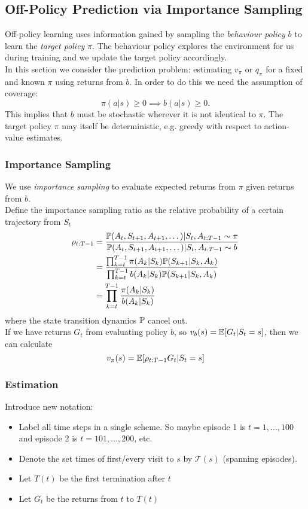 \subsection{Off-Policy Prediction via Importance Sampling}
Off-policy learning uses information gained by sampling the \emph{behaviour policy} $b$ to learn the \emph{target policy} $\pi$. The behaviour policy explores the environment for us during training and we update the target policy accordingly.\\

In this section we consider the prediction problem: estimating $v_\pi$ or $q_\pi$ for a fixed and known $\pi$ using returns from $b$. In order to do this we need the assumption of coverage:
\begin{equation}
    \pi(a|s) \geq 0 \implies b(a|s) \geq 0.
\end{equation}
This implies that $b$ must be stochastic wherever it is not identical to $\pi$. The target policy $\pi$ may itself be deterministic, e.g. greedy with respect to action-value estimates.

\subsubsection*{Importance Sampling}
We use \emph{importance sampling} to evaluate expected returns from $\pi$ given returns from $b$.\\

Define the importance sampling ratio as the relative probability of a certain trajectory from $S_t$
\begin{align}
    \rho_{t:T-1} &= \frac{\P{}(A_t, S_{t+1}, A_{t+1}, \dots)| S_t, A_{t:T-1} \sim \pi}{\P{}(A_t, S_{t+1}, A_{t+1}, \dots)| S_t, A_{t:T-1} \sim b} \\
                 &= \frac{\prod_{k=t}^{T-1}\pi(A_k|S_k)\P{}(S_{k+1}|S_k, A_k)}{\prod_{k=t}^{T-1}b(A_k|S_k)\P{}(S_{k+1}|S_k, A_k)}\\
                 &=\prod_{k=t}^{T-1}\frac{\pi(A_k|S_k)}{b(A_k|S_k)}
\end{align}
where the state transition dynamics $\P{}$ cancel out.\\

If we have returns $G_t$ from evaluating policy $b$, so $v_b(s) = \E[G_t|S_t=s]$, then we can calculate
\[
    v_\pi(s) = \E[\rho_{t:T-1}G_t|S_t=s]
\]

\subsubsection*{Estimation}
Introduce new notation:
\begin{itemize}
    \item Label all time steps in a single scheme. So maybe episode 1 is $t=1, \dots, 100$ and episode 2 is $t = 101, \dots, 200$, etc.
    \item Denote the set times of first/every visit to $s$ by $\mathcal{T}(s)$ (spanning episodes).
    \item Let $T(t)$ be the first termination after $t$
    \item Let $G_t$ be the returns from $t$ to $T(t)$
\end{itemize}

